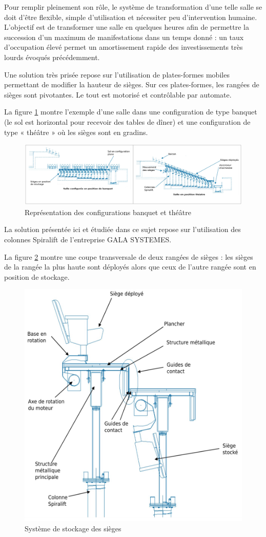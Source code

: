 Pour remplir pleinement son rôle, le système de transformation d'une telle salle se doit d'être flexible, simple d'utilisation et nécessiter peu d'intervention humaine. L'objectif est de transformer une salle en quelques heures afin de permettre la succession d'un maximum de manifestations dans un temps donné : un taux d'occupation élevé permet un amortissement rapide des investissements très lourds évoqués précédemment.

Une solution très prisée repose sur l'utilisation de plates-formes mobiles permettant de modifier la hauteur de sièges. Sur ces plates-formes, les rangées de sièges sont pivotantes. Le tout est motorisé et contrôlable par automate.

La figure \ref{fig02} montre l'exemple d'une salle dans une configuration de type \og banquet \fg (le sol est horizontal pour recevoir des tables de dîner) et une configuration de type « théâtre » où les sièges sont en gradins.

\begin{figure}[!h]
 \centering\includegraphics[width=0.7\linewidth]{img/fig02}
 \caption{Représentation des configurations \og banquet \fg et \og théâtre \fg}
 \label{fig02}
\end{figure}

La solution présentée ici et étudiée dans ce sujet repose sur l'utilisation des colonnes Spiralift de l'entreprise GALA SYSTEMES.

La figure \ref{fig03} montre une coupe transversale de deux rangées de sièges : les sièges de la rangée la plus haute sont déployés alors que ceux de l'autre rangée sont en position de stockage.

\begin{figure}[!h]
 \centering\includegraphics[width=0.7\linewidth]{img/fig03}
 \caption{Système de stockage des sièges}
 \label{fig03}
\end{figure}

